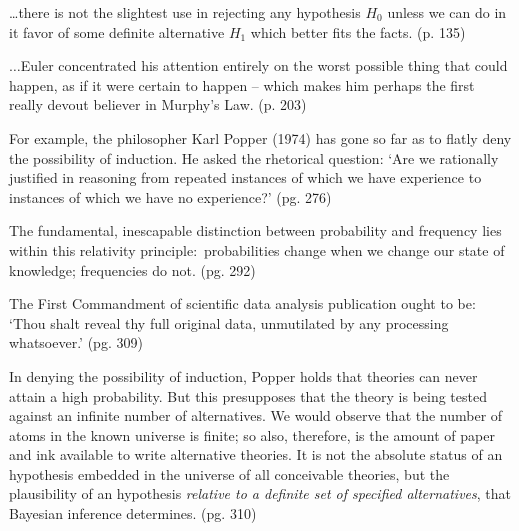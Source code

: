 \documentclass[8pt]{article}
\begin{document}
    \begin{displayquote}
        \ldots there is not the slightest use in rejecting any hypothesis $H_0$ unless we can do in it favor of some definite alternative $H_1$ which better fits the facts. (p. 135)
    \end{displayquote}

    \begin{displayquote}
        $\ldots$Euler concentrated his attention entirely on the worst possible thing that could happen, as if it were certain to happen -- which makes him perhaps the first really devout believer in Murphy's Law. (p. 203)
    \end{displayquote}

    \begin{displayquote}
        For example, the philosopher Karl Popper (1974) has gone so far as to flatly deny the possibility of induction. He asked the rhetorical question: `Are we rationally justified in reasoning from repeated instances of which we have experience to instances of which we have no experience?' (pg. 276)
    \end{displayquote}
    
    \begin{displayquote} 
        The fundamental, inescapable distinction between probability and frequency lies within this relativity principle:\ probabilities change when we change our state of knowledge; frequencies do not. (pg. 292)
    \end{displayquote}

    \begin{displayquote}
        The First Commandment of scientific data analysis publication ought to be: `Thou shalt reveal thy full original data, unmutilated by any processing whatsoever.' (pg. 309)
    \end{displayquote}

    \begin{displayquote}
        In denying the possibility of induction, Popper holds that theories can never attain a high probability. But this presupposes that the theory is being tested against an infinite number of alternatives. We would observe that the number of atoms in the known universe is finite; so also, therefore, is the amount of paper and ink available to write alternative theories. It is not the absolute status of an hypothesis embedded in the universe of all conceivable theories, but the plausibility of an hypothesis \textit{relative to a definite set of specified alternatives}, that Bayesian inference determines. (pg. 310)
    \end{displayquote}
\end{document}
